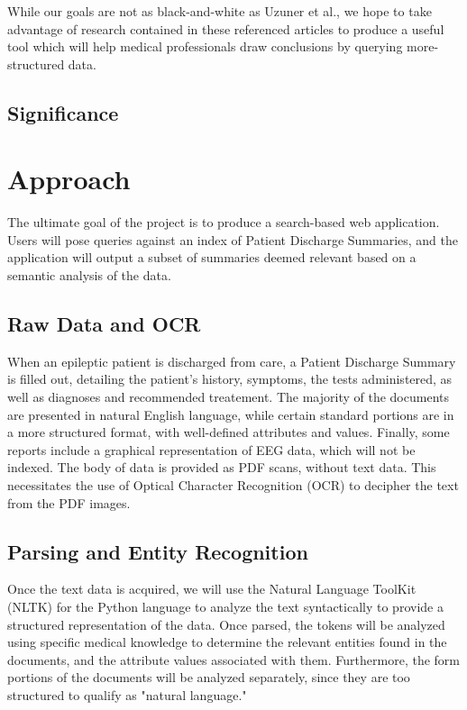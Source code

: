\documentclass[12pt]{article}
\begin{document}
While our goals are not as black-and-white as Uzuner et al., we hope to take advantage of
research contained in these referenced articles to produce a useful tool which will
help medical professionals draw conclusions by querying more-structured data.

\subsection{Significance}


\section{Approach}
The ultimate goal of the project is to produce a search-based web application.
Users will pose queries against an index of Patient Discharge Summaries, and the
application will output a subset of summaries deemed relevant based on a semantic
analysis of the data.

\subsection{Raw Data and OCR}
When an epileptic patient is discharged from care, a Patient Discharge Summary is
filled out, detailing the patient's history, symptoms, the tests administered, as
well as diagnoses and recommended treatement. The majority of the documents are
presented in natural English language, while certain standard portions are in a
more structured format, with well-defined attributes and values. Finally, some
reports include a graphical representation of EEG data, which will not be indexed.
The body of data is provided as PDF scans, without text data. This necessitates the use
of Optical Character Recognition (OCR) to decipher the text from the PDF images.

\subsection{Parsing and Entity Recognition}
Once the text data is acquired, we will use the Natural Language ToolKit (NLTK)
for the Python language to analyze the text syntactically to provide a structured
representation of the data. Once parsed, the tokens will be analyzed using specific
medical knowledge to determine the relevant entities found in the documents, and the
attribute values associated with them. Furthermore, the form portions of the documents
will be analyzed separately, since they are too structured to qualify as "natural
language."
\end{document}
